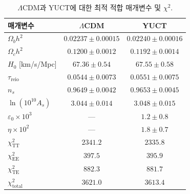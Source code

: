 \documentclass[11pt,a4paper]{article}
\begin{document}
	\begin{table}[H]
		\centering
		\caption{$\Lambda$CDM과 YUCT에 대한 최적 적합 매개변수 및 $\chi^2$.}
		\label{tab:results}
		\LARGE
		\begin{tabular}{lcc}
			\toprule
			매개변수 & $\Lambda$CDM & YUCT \\
			\midrule
			$\Omega_b h^2$ & $0.02237 \pm 0.00015$ & $0.02240 \pm 0.00016$ \\
			$\Omega_c h^2$ & $0.1200 \pm 0.0012$ & $0.1192 \pm 0.0014$ \\
			$H_0$ [km/s/Mpc] & $67.36 \pm 0.54$ & $67.55 \pm 0.58$ \\
			$\tau_{\mathrm{reio}}$ & $0.0544 \pm 0.0073$ & $0.0551 \pm 0.0075$ \\
			$n_s$ & $0.9649 \pm 0.0042$ & $0.9653 \pm 0.0045$ \\
			$\ln(10^{10}A_s)$ & $3.044 \pm 0.014$ & $3.048 \pm 0.015$ \\
			$\varepsilon_0 \times 10^3$ & — & $1.2 \pm 0.8$ \\
			$\eta \times 10^2$ & — & $1.8 \pm 0.7$ \\
			\midrule
			$\chi^2_{\mathrm{TT}}$ & $2341.2$ & $2335.8$ \\
			$\chi^2_{\mathrm{EE}}$ & $397.5$ & $395.9$ \\
			$\chi^2_{\mathrm{TE}}$ & $882.3$ & $881.7$ \\
			$\chi^2_{\mathrm{total}}$ & $3621.0$ & $3613.4$ \\
			\bottomrule
		\end{tabular}
	\end{table}
	
\end{document}
